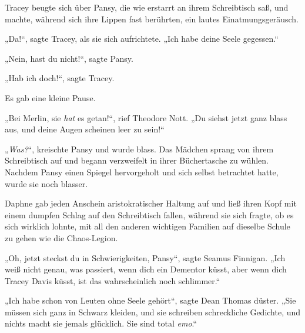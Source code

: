 Tracey beugte sich über Pansy, die wie erstarrt an ihrem Schreibtisch saß, und machte, während sich ihre Lippen fast berührten, ein lautes Einatmungsgeräusch.

„Da!“, sagte Tracey, als sie sich aufrichtete.
„Ich habe deine Seele gegessen.“

„Nein, hast du nicht!“, sagte Pansy.

„Hab ich doch!“, sagte Tracey.

Es gab eine kleine Pause.

„Bei Merlin, sie \emph{hat} es getan!“, rief Theodore Nott.
„Du siehst jetzt ganz blass aus, und deine Augen scheinen leer zu sein!“

„\emph{Was?}“, kreischte Pansy und wurde blass. Das Mädchen sprang von ihrem Schreibtisch auf und begann verzweifelt in ihrer Büchertasche zu wühlen. Nachdem Pansy einen Spiegel hervorgeholt und sich selbst betrachtet hatte, wurde sie noch blasser.

Daphne gab jeden Anschein aristokratischer Haltung auf und ließ ihren Kopf mit einem dumpfen Schlag auf den Schreibtisch fallen, während sie sich fragte, ob es sich wirklich lohnte, mit all den anderen wichtigen Familien auf dieselbe Schule zu gehen wie die Chaos-Legion.

„Oh, jetzt steckst du in Schwierigkeiten, Pansy“, sagte Seamus Finnigan.
„Ich weiß nicht genau, was passiert, wenn dich ein Dementor küsst, aber wenn dich Tracey Davis küsst, ist das wahrscheinlich noch schlimmer.“

„Ich habe schon von Leuten ohne Seele gehört“, sagte Dean Thomas düster.
„Sie müssen sich ganz in Schwarz kleiden, und sie schreiben schreckliche Gedichte, und nichts macht sie jemals glücklich. Sie sind total \emph{emo}.“

